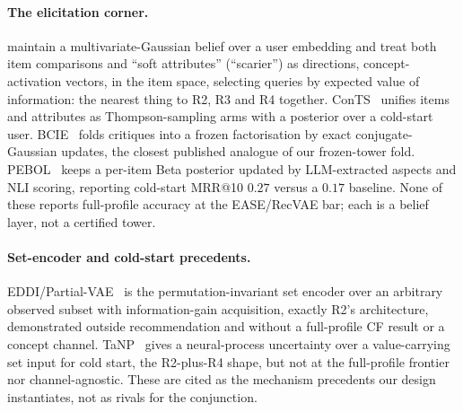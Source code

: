 \documentclass[manuscript,screen]{acmart}
\begin{document}
\paragraph{The elicitation corner.} \citet{biyik2023soft} maintain a multivariate-Gaussian belief over a user embedding and treat both item comparisons and ``soft attributes'' (``scarier'') as directions, concept-activation vectors, in the item space, selecting queries by expected value of information: the nearest thing to R2, R3 and R4 together. ConTS~\citep{li2021seamlessly} unifies items and attributes as Thompson-sampling arms with a posterior over a cold-start user. BCIE~\citep{toroghi2023bcie} folds critiques into a frozen factorisation by exact conjugate-Gaussian updates, the closest published analogue of our frozen-tower fold. PEBOL~\citep{austin2024bayesian} keeps a per-item Beta posterior updated by LLM-extracted aspects and NLI scoring, reporting cold-start MRR@10 $0.27$ versus a $0.17$ baseline. None of these reports full-profile accuracy at the EASE/RecVAE bar; each is a belief layer, not a certified tower.

\paragraph{Set-encoder and cold-start precedents.} EDDI/Partial-VAE~\citep{ma2019eddi} is the permutation-invariant set encoder over an arbitrary observed subset with information-gain acquisition, exactly R2's architecture, demonstrated outside recommendation and without a full-profile CF result or a concept channel. TaNP~\citep{lin2021tanp} gives a neural-process uncertainty over a value-carrying set input for cold start, the R2-plus-R4 shape, but not at the full-profile frontier nor channel-agnostic. These are cited as the mechanism precedents our design instantiates, not as rivals for the conjunction.
\end{document}
